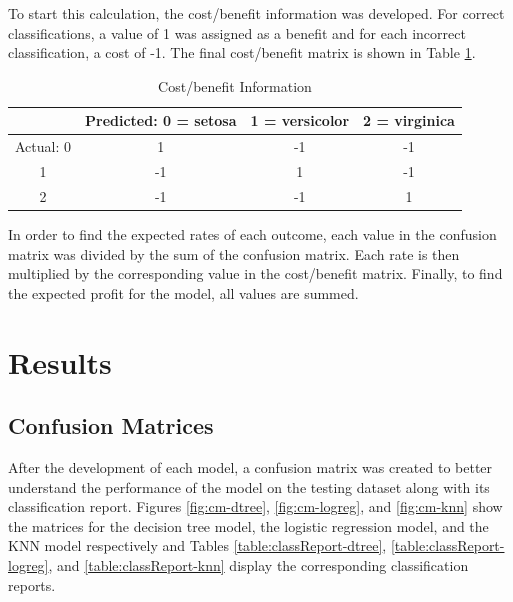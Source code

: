 \documentclass[journal]{IEEEtran}
\begin{document}
To start this calculation, the cost/benefit information was developed. For correct classifications, a value of 1 was assigned as a benefit and for each incorrect classification, a cost of -1. The final cost/benefit matrix is shown in Table \ref{table:costmatrix}.

\begin{table}[h!]
\centering
\begin{tabular}{ c || c | c | c }
& Predicted: 0 = setosa &  1 = versicolor &  2 = virginica \\
\hline
\hline
Actual: 0 & 1 & -1 & -1 \\
1 & -1 & 1 & -1 \\
2 & -1 & -1 & 1 \\
\end{tabular}
\caption{Cost/benefit Information}
\label{table:costmatrix}
\end{table}

\vspace{10px}
In order to find the expected rates of each outcome, each value in the confusion matrix was divided by the sum of the confusion matrix. Each rate is then multiplied by the corresponding value in the cost/benefit matrix. Finally, to find the expected profit for the model, all values are summed. 

\vspace*{30px}
\section{Results}
\label{sec:results}

\subsection{Confusion Matrices}

After the development of each model, a confusion matrix was created to better understand the performance of the model on the testing dataset along with its classification report. Figures \ref{fig:cm-dtree}, \ref{fig:cm-logreg}, and \ref{fig:cm-knn} show the matrices for the decision tree model, the logistic regression model, and the KNN model respectively and Tables \ref{table:classReport-dtree}, \ref{table:classReport-logreg}, and \ref{table:classReport-knn} display the corresponding classification reports. 
\end{document}

